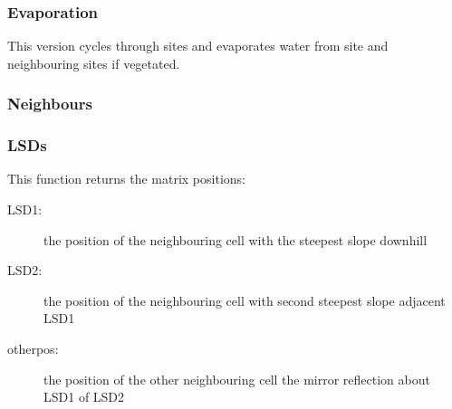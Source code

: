 \subsubsection{Evaporation}


This version cycles through sites and evaporates water from site and
neighbouring sites if vegetated.


\begin{usessubs}
\end{usessubs}

\subsubsection{Neighbours}



\subsubsection{LSDs}


This function returns the matrix positions:

\vspace{-2mm}
\begin{description}
\item [{LSD1:}] the position of the neighbouring cell with the steepest
slope downhill
\item [{LSD2:}] the position of the neighbouring cell with second steepest
slope adjacent LSD1
\item [{otherpos:}] the position of the other neighbouring cell the mirror
reflection about LSD1 of LSD2
\end{description}

